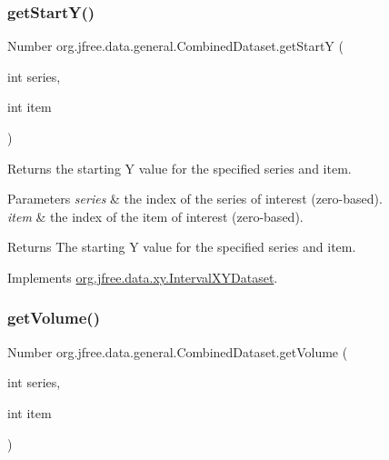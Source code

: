 \mbox{\label{classorg_1_1jfree_1_1data_1_1general_1_1_combined_dataset_a61823c1340aecd2cdb79536f78ca1d89}} 
\subsubsection{\texorpdfstring{get\+Start\+Y()}{getStartY()}}
{\footnotesize\ttfamily Number org.\+jfree.\+data.\+general.\+Combined\+Dataset.\+get\+StartY (\begin{DoxyParamCaption}\item[{int}]{series,  }\item[{int}]{item }\end{DoxyParamCaption})}

Returns the starting Y value for the specified series and item.


\begin{DoxyParams}{Parameters}
{\em series} & the index of the series of interest (zero-\/based). \\
\hline
{\em item} & the index of the item of interest (zero-\/based).\\
\hline
\end{DoxyParams}
\begin{DoxyReturn}{Returns}
The starting Y value for the specified series and item. 
\end{DoxyReturn}


Implements \mbox{\hyperlink{interfaceorg_1_1jfree_1_1data_1_1xy_1_1_interval_x_y_dataset_afdd414735adb233734bc35b76a005ed9}{org.\+jfree.\+data.\+xy.\+Interval\+X\+Y\+Dataset}}.

\mbox{\label{classorg_1_1jfree_1_1data_1_1general_1_1_combined_dataset_abd11201b4e46155128c2662fc54aa72c}} 
\subsubsection{\texorpdfstring{get\+Volume()}{getVolume()}}
{\footnotesize\ttfamily Number org.\+jfree.\+data.\+general.\+Combined\+Dataset.\+get\+Volume (\begin{DoxyParamCaption}\item[{int}]{series,  }\item[{int}]{item }\end{DoxyParamCaption})}

